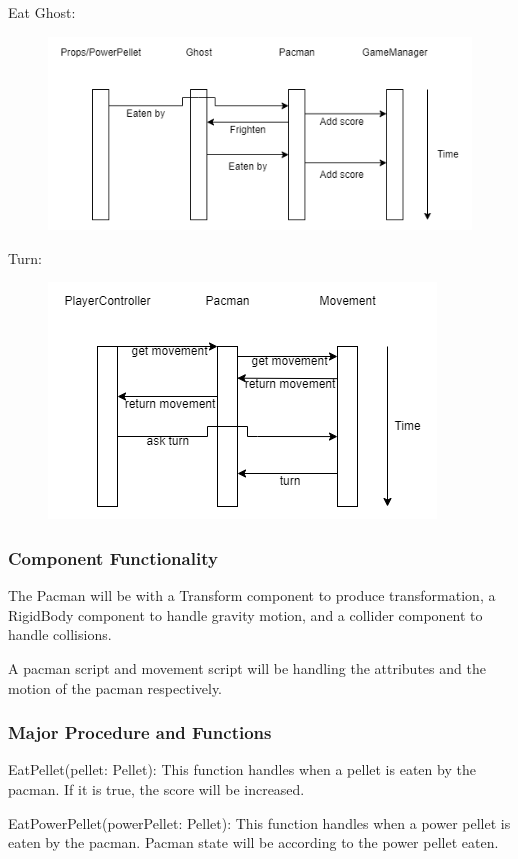 \documentclass[11pt]{article}
\begin{document}
Eat Ghost:
\begin{figure}[H]
    \centering
    \includegraphics*[scale=0.4]{Pacman_sequence-eatGhost.png}
\end{figure}
Turn:
\begin{figure}[H]
    \centering
    \includegraphics*[scale=0.4]{Pacman_sequence-turn.png}
\end{figure}
\subsubsection{Component Functionality}
The Pacman will be with a Transform component to produce transformation, a RigidBody component to handle gravity motion, and a collider component to handle collisions.

A pacman script and movement script will be handling the attributes and the motion of the pacman respectively.

\subsubsection{Major Procedure and Functions}
EatPellet(pellet: Pellet): This function handles when a pellet is eaten by the pacman. If it is true, the score will be increased.

EatPowerPellet(powerPellet: Pellet): This function handles when a power pellet is eaten by the pacman. Pacman state will be according to the power pellet eaten.
\end{document}
